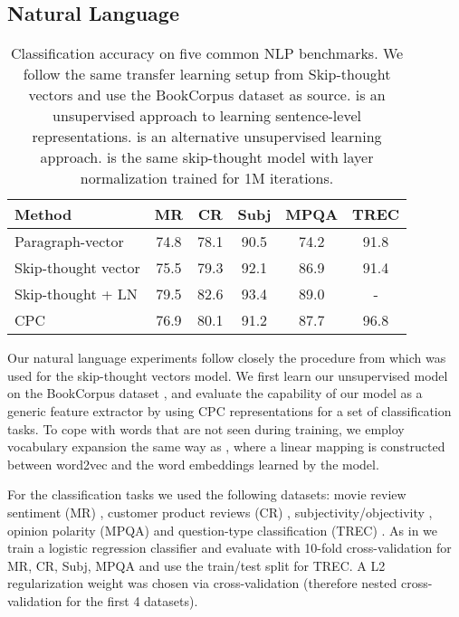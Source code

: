 \subsection{Natural Language}

\begin{table*}[ht]
  \centering
  \begin{tabularx}{0.73\textwidth}{l|c|c|c|c|c}
    \toprule
    \textbf{Method} & \textbf{MR} & \textbf{CR} & \textbf{Subj} & \textbf{MPQA} & \textbf{TREC}  \\
    \midrule\midrule
    Paragraph-vector \cite{le2014distributed} & 74.8 & 78.1 & 90.5 & 74.2 & 91.8 \\  
    Skip-thought vector \cite{kiros2015skip} & 75.5 & 79.3 & 92.1 & 86.9 & 91.4 \\
    Skip-thought + LN \cite{ba2016layernorm} & 79.5 & 82.6 & 93.4 & 89.0 & -	\\
    \midrule
    CPC & 76.9 & 80.1 & 91.2 &	87.7 & 96.8  \\
    \bottomrule
  \end{tabularx}
  \vspace{5pt}
  \caption{Classification accuracy on five common NLP benchmarks. We follow the same transfer learning setup from Skip-thought vectors \cite{kiros2015skip} and use the BookCorpus dataset as source. \cite{le2014distributed} is an unsupervised approach to learning sentence-level representations. \cite{kiros2015skip} is an alternative unsupervised learning approach. \cite{ba2016layernorm} is the same skip-thought model with layer normalization trained for 1M iterations.}
  \label{tab:textclass}
\end{table*}

Our natural language experiments follow closely the procedure from \cite{kiros2015skip} which was used for the skip-thought vectors model. We first learn our unsupervised model on the BookCorpus dataset \cite{zhu2015aligning}, and evaluate the capability of our model as a generic feature extractor by using CPC representations for a set of classification tasks.
To cope with words that are not seen during training, we employ vocabulary expansion the same way as \cite{kiros2015skip}, where a linear mapping is constructed between word2vec and the word embeddings learned by the model.

For the classification tasks we used the following datasets: movie review sentiment (MR) \cite{pang2005seeing}, customer product reviews (CR) \cite{hu2004mining}, subjectivity/objectivity \cite{pang2004sentimental}, opinion polarity (MPQA) \cite{wiebe2005annotating} and question-type classification (TREC) \cite{li2002learning}. As in \cite{kiros2015skip} we train a logistic regression classifier and evaluate with 10-fold cross-validation for MR, CR, Subj, MPQA and use the train/test split for TREC. A L2 regularization weight was chosen via cross-validation (therefore nested cross-validation for the first 4 datasets). 

